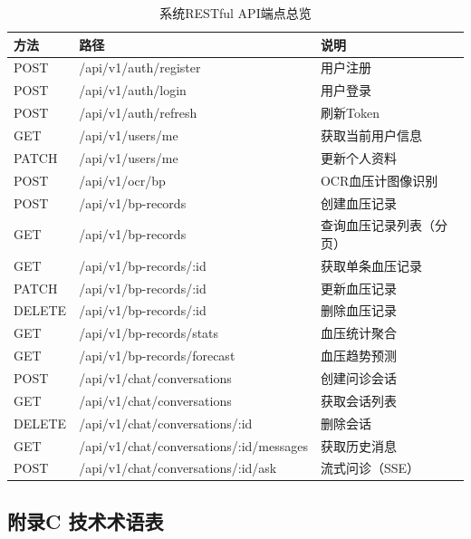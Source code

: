 \documentclass[zihao=-4,a4paper]{ctexart}
\numberwithin{figure}{section}
\numberwithin{table}{section}
\begin{document}
\begin{table}[H]
\centering
\caption{系统RESTful API端点总览}
\label{tab:api-list}
\begin{tabular}{lll}
\toprule
\textbf{方法} & \textbf{路径} & \textbf{说明} \\
\midrule
POST & /api/v1/auth/register & 用户注册 \\
POST & /api/v1/auth/login & 用户登录 \\
POST & /api/v1/auth/refresh & 刷新Token \\
GET  & /api/v1/users/me & 获取当前用户信息 \\
PATCH & /api/v1/users/me & 更新个人资料 \\
POST & /api/v1/ocr/bp & OCR血压计图像识别 \\
POST & /api/v1/bp-records & 创建血压记录 \\
GET  & /api/v1/bp-records & 查询血压记录列表（分页） \\
GET  & /api/v1/bp-records/:id & 获取单条血压记录 \\
PATCH & /api/v1/bp-records/:id & 更新血压记录 \\
DELETE & /api/v1/bp-records/:id & 删除血压记录 \\
GET  & /api/v1/bp-records/stats & 血压统计聚合 \\
GET  & /api/v1/bp-records/forecast & 血压趋势预测 \\
POST & /api/v1/chat/conversations & 创建问诊会话 \\
GET  & /api/v1/chat/conversations & 获取会话列表 \\
DELETE & /api/v1/chat/conversations/:id & 删除会话 \\
GET  & /api/v1/chat/conversations/:id/messages & 获取历史消息 \\
POST & /api/v1/chat/conversations/:id/ask & 流式问诊（SSE） \\
\bottomrule
\end{tabular}
\end{table}

\subsection*{附录C 技术术语表}
\end{document}
